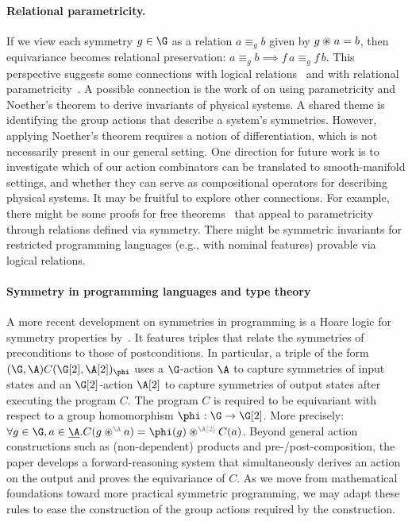 \paragraph{Relational parametricity.}
If we view each symmetry $g \in \G$ as a relation $a \equiv_g b$ given
by $g\act a = b$, then equivariance becomes relational preservation:
$a \equiv_g b \implies f\,a \equiv_g f\,b$. This perspective suggests
some connections with logical
relations~\cite{plotkin:lambda-definability-and-logical-relations} and
with relational
parametricity~\cite{reynolds:types-abstraciton-and-parametric-polymorphism}.
A possible connection is the work of \citet{DBLP:conf/popl/Atkey14} on
using parametricity and Noether's theorem to derive invariants of
physical systems. A shared theme is identifying the group actions that
describe a system's symmetries.  However, applying Noether's theorem
requires a notion of differentiation, which is not necessarily present in our
general setting. One direction for future work is to investigate which
of our action combinators can be translated to smooth-manifold
settings, and whether they can serve as compositional operators for
describing physical systems. It may be fruitful to explore other
connections. For example, there might be some proofs for free
theorems~\cite{wadler:theorems-for-free} that appeal to parametricity
through relations defined via symmetry. There might be symmetric
invariants for restricted programming languages (e.g., with nominal
features) provable via logical relations.

\paragraph{Symmetry in programming languages and type theory}
A more recent development on symmetries in programming is a Hoare
logic for symmetry properties by~\citet{10.1145/3763080}. It features
triples that relate the symmetries of preconditions to those of
postconditions. In particular, a triple of the form $(\G,\A) C
(\H,\B)_\phi$ uses a $\G$-action $\A$ to capture symmetries of input
states and an $\H$-action $\B$ to capture symmetries of output states
after executing the program $C$. The program $C$ is required to be
equivariant with respect to a group homomorphism $\phi : \G \to \H$.
More precisely:
\(
  \forall g \in \G, a \in \carrier\A. C(g \act[\A] a) = \phi(g) \act[\B] C(a)
\).
Beyond general action constructions such as (non-dependent) products
and pre-/post-composition, the paper develops a forward-reasoning
system that simultaneously derives an action on the output and proves
the equivariance of $C$. As we move from mathematical foundations
toward more practical symmetric programming, we
may adapt these rules to ease the construction of the group
actions required by the \WLOG construction.

